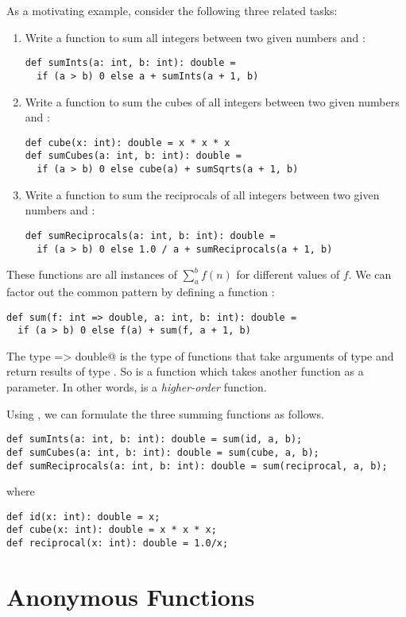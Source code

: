 \documentclass[11pt]{book}
\begin{document}
As a motivating example, consider the following three related tasks:
\begin{enumerate}
\item
Write a function to sum all integers between two given numbers \verb@a@ and \verb@b@:
\begin{verbatim}
def sumInts(a: int, b: int): double =
  if (a > b) 0 else a + sumInts(a + 1, b)
\end{verbatim}
\item 
Write a function to sum the cubes of all integers between two given numbers 
\verb@a@ and \verb@b@:
\begin{verbatim}
def cube(x: int): double = x * x * x
def sumCubes(a: int, b: int): double =
  if (a > b) 0 else cube(a) + sumSqrts(a + 1, b)
\end{verbatim}
\item
Write a function to sum the reciprocals of all integers between two given numbers 
\verb@a@ and \verb@b@:
\begin{verbatim}
def sumReciprocals(a: int, b: int): double =
  if (a > b) 0 else 1.0 / a + sumReciprocals(a + 1, b)
\end{verbatim}
\end{enumerate}
These functions are all instances of
\(\sum^b_a f(n)\) for different values of $f$. 
We can factor out the common pattern by defining a function \verb@sum@:
\begin{verbatim}
def sum(f: int => double, a: int, b: int): double =
  if (a > b) 0 else f(a) + sum(f, a + 1, b)
\end{verbatim}
The type \verb@int => double@ is the type of functions that
take arguments of type \verb@int@ and return results of type
\verb@double@. So \verb@sum@ is a function which takes another function as 
a parameter. In other words, \verb@sum@ is a {\em higher-order}
function.

Using \verb@sum@, we can formulate the three summing functions as
follows.
\begin{verbatim}
def sumInts(a: int, b: int): double = sum(id, a, b);
def sumCubes(a: int, b: int): double = sum(cube, a, b);
def sumReciprocals(a: int, b: int): double = sum(reciprocal, a, b);
\end{verbatim}
where
\begin{verbatim}
def id(x: int): double = x;
def cube(x: int): double = x * x * x;
def reciprocal(x: int): double = 1.0/x;
\end{verbatim}

\section{Anonymous Functions}
\end{document}
